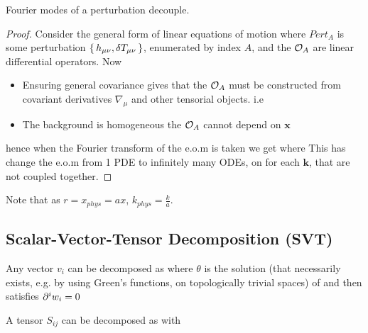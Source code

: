 \documentclass{article}
\begin{document}
\begin{prop}
Fourier modes of a perturbation decouple. 
\end{prop}
\begin{proof}
Consider the general form of linear equations of motion
where $Pert_A$ is some perturbation $\set{h_{\mu\nu},\delta T_{\mu\nu}}$, enumerated by index $A$, and the $\mathcal{O}_A$ are linear differential operators.
Now 
\begin{itemize}
    \item Ensuring general covariance gives that the $\mathcal{O}_A$ must be constructed from covariant derivatives $\nabla_\mu$ and other tensorial objects. i.e 
    \item The background is homogeneous the $\mathcal{O}_A$ cannot depend on $\bm{x}$
\end{itemize}
hence when the Fourier transform of the e.o.m is taken we get 
where 
This has change the e.o.m from 1 PDE to infinitely many ODEs, on for each $\bm{k}$, that are not coupled together. 
\end{proof}

Note that as $r = x_{phys} = a x$,  $k_{phys} = \frac{k}{a}$. 

\subsection{Scalar-Vector-Tensor Decomposition (SVT)}

\begin{definition}
Any vector $v_i$ can be decomposed as 
where $\theta$ is the solution (that necessarily exists, e.g. by using Green's functions, on topologically trivial spaces) of 
and then 
satisfies $\partial^i w_i = 0$
\end{definition}

\begin{definition}
A tensor $S_{ij}$ can be decomposed as 
with 
\end{definition}
\end{document}
